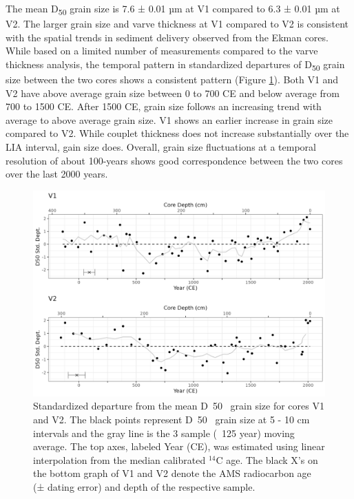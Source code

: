 \documentclass[Royal,times,doublespace,sageh]{sagej}
\begin{document}
The mean D\textsubscript{50} grain size is 7.6 ± 0.01 µm at V1 compared
to 6.3 ± 0.01 µm at V2. The larger grain size and varve thickness at V1
compared to V2 is consistent with the spatial trends in sediment
delivery observed from the Ekman cores. While based on a limited number
of measurements compared to the varve thickness analysis, the temporal
pattern in standardized departures of D\textsubscript{50} grain size
between the two cores shows a consistent pattern (Figure
\ref{fig:particle}). Both V1 and V2 have above average grain size
between 0 to 700 CE and below average from 700 to 1500 CE. After 1500
CE, grain size follows an increasing trend with average to above average
grain size. V1 shows an earlier increase in grain size compared to V2.
While couplet thickness does not increase substantially over the LIA
interval, gain size does. Overall, grain size fluctuations at a temporal
resolution of about 100-years shows good correspondence between the two
cores over the last 2000 years.

\begin{figure}

{\centering \includegraphics[width=1\linewidth]{figs/V1_V2_grainsize_vs_depth_and_C14_est_yr} 

}

\caption{Standardized departure from the mean D~50~ grain size for cores V1 and V2. The black points represent D~50~ grain size at 5 - 10 cm intervals and the gray line is the 3 sample (~125 year) moving average. The top axes, labeled Year (CE), was estimated using linear interpolation from the median calibrated $^{14}$C age. The black X's on the bottom graph of V1 and V2 denote the AMS radiocarbon age (± dating error) and depth of the respective sample.\label{particle}}\label{fig:particle}
\end{figure}
\end{document}
